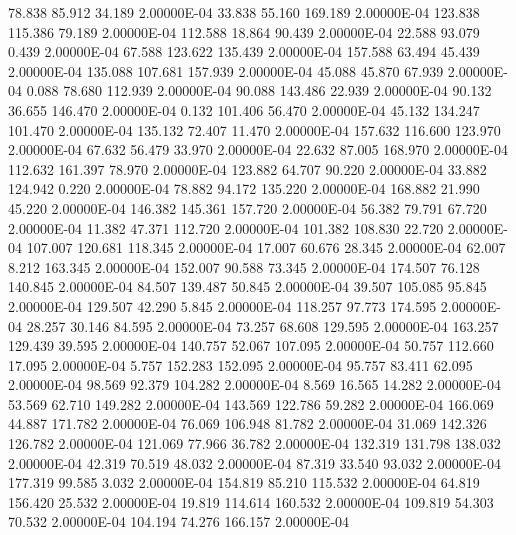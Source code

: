     78.838    85.912    34.189  2.00000E-04
    33.838    55.160   169.189  2.00000E-04
   123.838   115.386    79.189  2.00000E-04
   112.588    18.864    90.439  2.00000E-04
    22.588    93.079     0.439  2.00000E-04
    67.588   123.622   135.439  2.00000E-04
   157.588    63.494    45.439  2.00000E-04
   135.088   107.681   157.939  2.00000E-04
    45.088    45.870    67.939  2.00000E-04
     0.088    78.680   112.939  2.00000E-04
    90.088   143.486    22.939  2.00000E-04
    90.132    36.655   146.470  2.00000E-04
     0.132   101.406    56.470  2.00000E-04
    45.132   134.247   101.470  2.00000E-04
   135.132    72.407    11.470  2.00000E-04
   157.632   116.600   123.970  2.00000E-04
    67.632    56.479    33.970  2.00000E-04
    22.632    87.005   168.970  2.00000E-04
   112.632   161.397    78.970  2.00000E-04
   123.882    64.707    90.220  2.00000E-04
    33.882   124.942     0.220  2.00000E-04
    78.882    94.172   135.220  2.00000E-04
   168.882    21.990    45.220  2.00000E-04
   146.382   145.361   157.720  2.00000E-04
    56.382    79.791    67.720  2.00000E-04
    11.382    47.371   112.720  2.00000E-04
   101.382   108.830    22.720  2.00000E-04
   107.007   120.681   118.345  2.00000E-04
    17.007    60.676    28.345  2.00000E-04
    62.007     8.212   163.345  2.00000E-04
   152.007    90.588    73.345  2.00000E-04
   174.507    76.128   140.845  2.00000E-04
    84.507   139.487    50.845  2.00000E-04
    39.507   105.085    95.845  2.00000E-04
   129.507    42.290     5.845  2.00000E-04
   118.257    97.773   174.595  2.00000E-04
    28.257    30.146    84.595  2.00000E-04
    73.257    68.608   129.595  2.00000E-04
   163.257   129.439    39.595  2.00000E-04
   140.757    52.067   107.095  2.00000E-04
    50.757   112.660    17.095  2.00000E-04
     5.757   152.283   152.095  2.00000E-04
    95.757    83.411    62.095  2.00000E-04
    98.569    92.379   104.282  2.00000E-04
     8.569    16.565    14.282  2.00000E-04
    53.569    62.710   149.282  2.00000E-04
   143.569   122.786    59.282  2.00000E-04
   166.069    44.887   171.782  2.00000E-04
    76.069   106.948    81.782  2.00000E-04
    31.069   142.326   126.782  2.00000E-04
   121.069    77.966    36.782  2.00000E-04
   132.319   131.798   138.032  2.00000E-04
    42.319    70.519    48.032  2.00000E-04
    87.319    33.540    93.032  2.00000E-04
   177.319    99.585     3.032  2.00000E-04
   154.819    85.210   115.532  2.00000E-04
    64.819   156.420    25.532  2.00000E-04
    19.819   114.614   160.532  2.00000E-04
   109.819    54.303    70.532  2.00000E-04
   104.194    74.276   166.157  2.00000E-04

